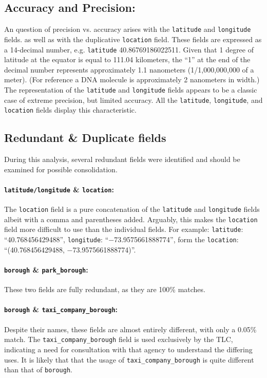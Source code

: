 \documentclass[linenumber]{jdsart}
\begin{document}
\subsection{Accuracy and Precision:}
\label{sec:precision}
An question of precision vs. accuracy arises with the \texttt{latitude} 
and \texttt{longitude} fields. as well as with the duplicative 
\texttt{location} field. These fields are expressed as 
a 14\mbox{-}decimal number, e.g. \texttt{latitude} 40.86769186022511. 
Given that 1 degree of latitude at the equator is equal to 111.04 
kilometers, the ``1'' at the end of the decimal number represents 
approximately 1.1 nanometers (1/1,000,000,000 of a meter). (For 
reference a DNA molecule is approximately 2 nanometers in width.) The 
representation of the \texttt{latitude} and \texttt{longitude} fields
appears to be a classic case of extreme precision, but limited 
accuracy. All the \texttt{latitude}, \texttt{longitude}, and \texttt{location}
fields display this characteristic. 


\subsection{Redundant \& Duplicate fields}
\label{sec:duplicates}
During this analysis, several redundant fields were identified and should 
be examined for possible consolidation.

\paragraph{\texttt{latitude/longitude} \& \texttt{location}:} 
The \texttt{location} field is a pure concatenation of 
the \texttt{latitude} and \texttt{longitude} fields albeit with a 
comma and parentheses added. Arguably, this makes the \texttt{location} field 
more difficult to use than the individual fields. For example:  
\texttt{latitude}: ``40.768456429488'', \texttt{longitude}: ``$-$73.9575661888774'', 
form the \texttt{location}: ``(40.768456429488, $-$73.9575661888774)''.

\paragraph{\texttt{borough} \& \texttt{park\_borough}:} These two fields are fully redundant, 
as they are 100\% matches.

\paragraph{\texttt{borough} \& \texttt{taxi\_company\_borough}:} Despite 
their names, these fields are almost entirely different, with only 
a 0.05\% match. The \texttt{taxi\_company\_borough} field is 
used exclusively by the TLC, indicating a need for consultation 
with that agency to understand the differing uses. It is 
likely that that the usage of \texttt{taxi\_company\_borough} is 
quite different than that of \texttt{borough}. 
\end{document}
